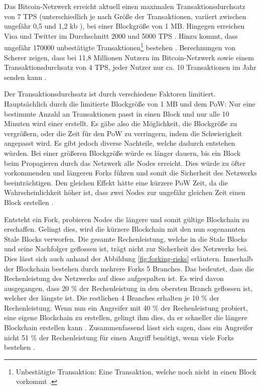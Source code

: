 Das Bitcoin-Netzwerk erreicht aktuell einen maximalen Transaktionsdurchsatz von 7 \acs{TPS} (unterschiedlich je nach Größe der Transaktionen, variiert zwischen ungefähr 0,5 und 1,2 kb \cite{Bitcoin.comTeamBitcoinTransactionSize}), bei einer Blockgröße von 1 MB. Hingegen erreichen Visa und Twitter im Durchschnitt 2000 und 5000 \acs{TPS} \cite[S.~28]{SwanBlockchainblueprintnew2015}. Hinzu kommt, dass ungefähr 170000 unbestätigte Transaktionen\footnote{Unbestätigte Transaktion: Eine Transaktion, welche noch nicht in einen Block vorkommt \cite[S.~13 ff.]{AntonopoulosMasteringbitcoin2015}.} bestehen \cite{BlockchainUnternehmenUnbestatigteTransaktionenBitcoin}. Berechnungen von Scherer zeigen, dass bei 11,8 Millionen Nutzern im Bitcoin-Netzwerk sowie einem Transaktionsdurchsatz von 4 \acs{TPS}, jeder Nutzer nur ca. 10 Transaktionen im Jahr senden kann \cite{SchererPerformanceScalabilityBlockchain2017}.

Der Transaktionsdurchsatz ist durch verschiedene Faktoren limitiert. Hauptsächlich durch die limitierte Blockgröße von 1 MB und dem \acs{PoW}: Nur eine bestimmte Anzahl an Transaktionen passt in einen Block und nur alle 10 Minuten wird einer erstellt. Es gäbe also die Möglichkeit, die Blockgröße zu vergrößern, oder die Zeit für den \acs{PoW} zu verringern, indem die Schwierigkeit angepasst wird. Es gibt jedoch diverse Nachteile, welche dadurch entstehen würden. Bei einer größeren Blockgröße würde es länger dauern, bis ein Block beim Propagieren durch das Netzwerk alle Nodes erreicht. Dies würde zu öfter vorkommenden und längeren Forks führen und somit die Sicherheit des Netzwerks beeinträchtigen. Den gleichen Effekt hätte eine kürzere \acs{PoW} Zeit, da die Wahrscheinlichkeit höher ist, dass zwei Nodes zur ungefähr gleichen Zeit einen Block erstellen \cite{SchererPerformanceScalabilityBlockchain2017}\cite{EthereumTeamEthereumWhitePaper2017}\cite{SompolinskyAcceleratingBitcoinTransaction2013}. 

Entsteht ein Fork, probieren Nodes die längere und somit gültige Blockchain zu erschaffen. Gelingt dies, wird die kürzere Blockchain mit den nun sogenannten Stale Blocks verworfen. Die gesamte Rechenleistung, welche in die Stale Blocks und seine Nachfolger geflossen ist, trägt nicht zur Sicherheit des Netzwerks bei. Dies lässt sich auch anhand der Abbildung \ref{fig:forking-risks} erläutern. Innerhalb der Blockchain bestehen durch mehrere Forks 5 Branches. Das bedeutet, dass die Rechenleistung des Netzwerks auf diese aufgespalten ist. Es wird davon ausgegangen, dass 20 \% der Rechenleistung in den obersten Branch geflossen ist, welcher der längste ist. Die restlichen 4 Branches erhalten je 10 \% der Rechenleistung. Wenn nun ein Angreifer mit 40 \% der Rechenleistung probiert, eine eigene Blockchain zu erstellen, gelingt ihm dies, da er schneller die längere Blockchain erstellen kann \cite{SompolinskyAcceleratingBitcoinTransaction2013}. Zusammenfassend lässt sich sagen, dass ein Angreifer nicht 51 \% der Rechenleistung für einen Angriff benötigt, wenn viele Forks bestehen \cite{Buterin12secondBlockTime2014}. 

